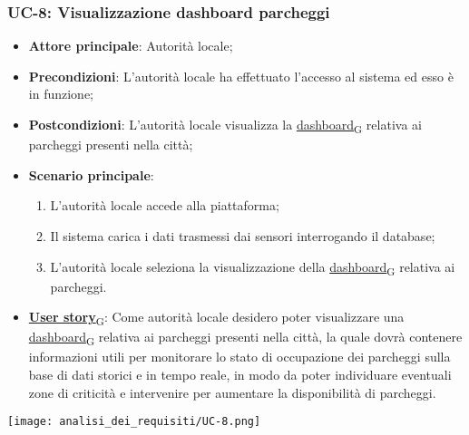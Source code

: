 \subsubsection{UC-8: Visualizzazione dashboard parcheggi}
\begin{itemize}
	\item \textbf{Attore principale}: Autorità locale;
	\item \textbf{Precondizioni}: L'autorità locale ha effettuato l'accesso al sistema ed esso è in funzione;
	\item \textbf{Postcondizioni}: L'autorità locale visualizza la \href{https://7last.github.io/docs/rtb/documentazione-interna/glossario\#dashboard}{dashboard\textsubscript{G}} relativa
	      ai parcheggi presenti nella città;
	\item \textbf{Scenario principale}:
	      \begin{enumerate}
		      \item L'autorità locale accede alla piattaforma;
		      \item Il sistema carica i dati trasmessi dai sensori interrogando il database;
		      \item L'autorità locale seleziona la visualizzazione della \href{https://7last.github.io/docs/rtb/documentazione-interna/glossario\#dashboard}{dashboard\textsubscript{G}} relativa ai parcheggi.
	      \end{enumerate}
	\item \href{https://7last.github.io/docs/rtb/documentazione-interna/glossario\#user-story}{\textbf{User story}\textsubscript{G}}:
	      Come autorità locale desidero poter visualizzare una \href{https://7last.github.io/docs/rtb/documentazione-interna/glossario\#dashboard}{dashboard\textsubscript{G}} relativa ai parcheggi presenti nella città, la quale
	      dovrà contenere informazioni utili per monitorare lo stato di occupazione dei parcheggi sulla base di dati storici e in tempo reale,
	      in modo da poter individuare eventuali zone di criticità e intervenire per aumentare la disponibilità di parcheggi.
\end{itemize}
\begin{center}
	\texttt{[image: analisi\_dei\_requisiti/UC-8.png]}
\end{center}

